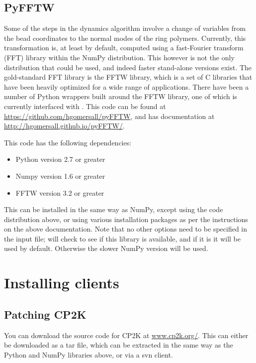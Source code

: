 \documentclass[11pt,english,fleqn]{report}
\begin{document}
\subsection{PyFFTW}

Some of the steps in the dynamics algorithm involve a change of variables
from the bead coordinates to the normal modes of the ring polymers.
Currently, this transformation is, at least by default, computed using
a fast-Fourier transform (FFT) library within the NumPy distribution.
This however is not the only distribution that could be used, and
indeed faster stand-alone versions exist. The gold-standard FFT library
is the FFTW library, which is a set of C libraries that have been
heavily optimized for a wide range of applications. There have been
a number of Python wrappers built around the FFTW library, one of which
is currently interfaced with \ipi. This code can be found at \url{https://github.com/hgomersall/pyFFTW},
and has documentation at \url{http://hgomersall.github.io/pyFFTW/}.

This code has the following dependencies:
\begin{itemize}
\item Python version 2.7 or greater
\item Numpy version 1.6 or greater
\item FFTW version 3.2 or greater
\end{itemize}
This can be installed in the same way as NumPy, except using the code
distribution above, or using various installation packages as per
the instructions on the above documentation. Note that no other options
need to be specified in the input file; \ipi will check to
see if this library is available, and if it is it will be used by
default. Otherwise the slower NumPy version will be used.


\section{Installing clients}

\label{clientinstall}

\subsection{Patching CP2K}


You can download the source code for CP2K at \url{www.cp2k.org/}.
This can either be downloaded as a tar file, which
can be extracted in the same way as the Python and NumPy
libraries above, or via a svn client. 
\end{document}
